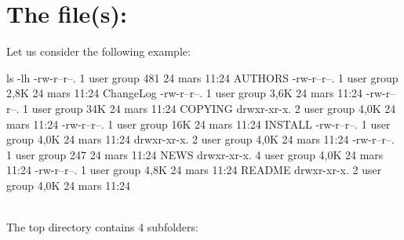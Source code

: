 \clearpage
\vspace{-1cm}
\section{The file(s): }

Let us consider the following example:
{\footnotesize{
\begin{script}
 ls -lh
-rw-r--r--. 1 user group  481 24 mars  11:24 AUTHORS
-rw-r--r--. 1 user group 2,8K 24 mars  11:24 ChangeLog
-rw-r--r--. 1 user group 3,6K 24 mars  11:24 
-rw-r--r--. 1 user group  34K 24 mars  11:24 COPYING
drwxr-xr-x. 2 user group 4,0K 24 mars  11:24 
-rw-r--r--. 1 user group  16K 24 mars  11:24 INSTALL
-rw-r--r--. 1 user group 4,0K 24 mars  11:24 
drwxr-xr-x. 2 user group 4,0K 24 mars  11:24 
-rw-r--r--. 1 user group  247 24 mars  11:24 NEWS
drwxr-xr-x. 4 user group 4,0K 24 mars  11:24 
-rw-r--r--. 1 user group 4,8K 24 mars  11:24 README
drwxr-xr-x. 2 user group 4,0K 24 mars  11:24 
\end{script}
}}
\vspace{-0.25cm}
\\
\noindent The top directory contains 4 subfolders:
